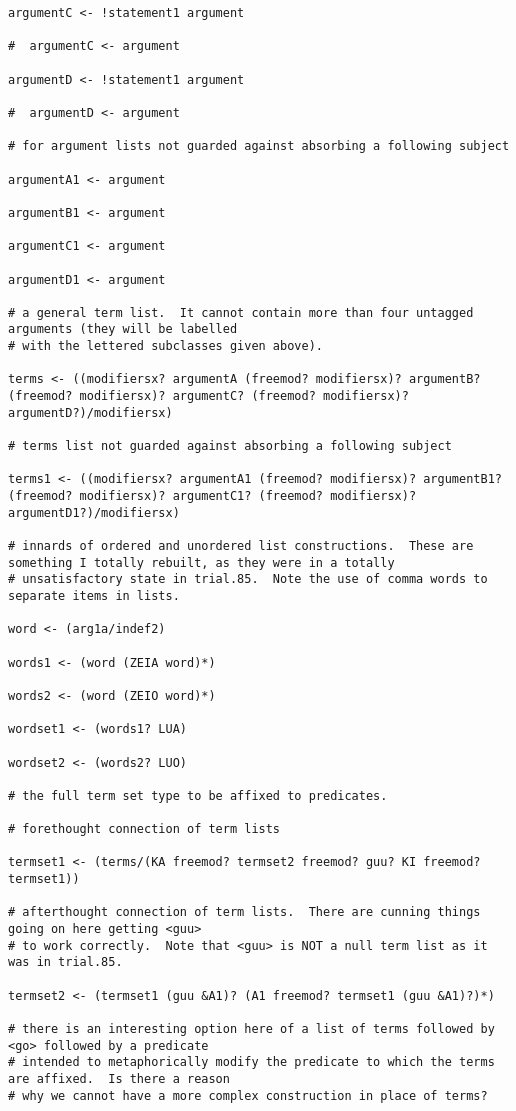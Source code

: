 \documentclass[12pt]{book}
\begin{document}
{\begin{verbatim}
argumentC <- !statement1 argument 

#  argumentC <- argument

argumentD <- !statement1 argument 

#  argumentD <- argument

# for argument lists not guarded against absorbing a following subject

argumentA1 <- argument

argumentB1 <- argument

argumentC1 <- argument

argumentD1 <- argument

# a general term list.  It cannot contain more than four untagged arguments (they will be labelled
# with the lettered subclasses given above).

terms <- ((modifiersx? argumentA (freemod? modifiersx)? argumentB? (freemod? modifiersx)? argumentC? (freemod? modifiersx)? argumentD?)/modifiersx)

# terms list not guarded against absorbing a following subject

terms1 <- ((modifiersx? argumentA1 (freemod? modifiersx)? argumentB1? (freemod? modifiersx)? argumentC1? (freemod? modifiersx)? argumentD1?)/modifiersx)

# innards of ordered and unordered list constructions.  These are something I totally rebuilt, as they were in a totally
# unsatisfactory state in trial.85.  Note the use of comma words to separate items in lists.

word <- (arg1a/indef2)

words1 <- (word (ZEIA word)*)

words2 <- (word (ZEIO word)*)

wordset1 <- (words1? LUA)

wordset2 <- (words2? LUO)

# the full term set type to be affixed to predicates.

# forethought connection of term lists

termset1 <- (terms/(KA freemod? termset2 freemod? guu? KI freemod? termset1))

# afterthought connection of term lists.  There are cunning things going on here getting <guu>
# to work correctly.  Note that <guu> is NOT a null term list as it was in trial.85.

termset2 <- (termset1 (guu &A1)? (A1 freemod? termset1 (guu &A1)?)*)

# there is an interesting option here of a list of terms followed by <go> followed by a predicate
# intended to metaphorically modify the predicate to which the terms are affixed.  Is there a reason
# why we cannot have a more complex construction in place of terms?


\end{verbatim}}
\end{document}
